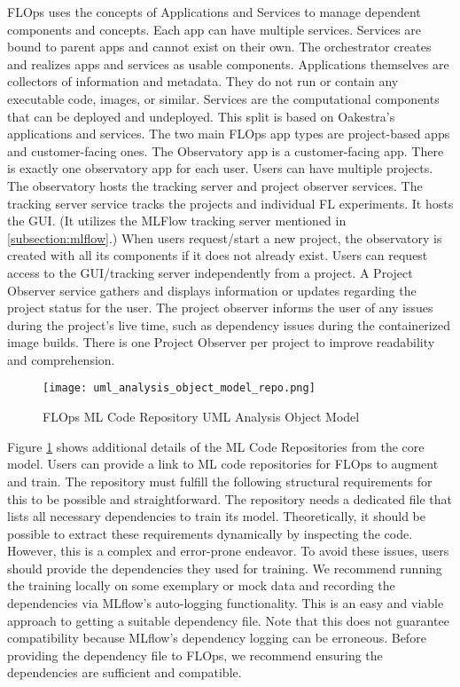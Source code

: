 FLOps uses the concepts of Applications and Services to manage dependent components and concepts.
Each app can have multiple services.
Services are bound to parent apps and cannot exist on their own.
The orchestrator creates and realizes apps and services as usable components.
Applications themselves are collectors of information and metadata.
They do not run or contain any executable code, images, or similar.
Services are the computational components that can be deployed and undeployed.
This split is based on Oakestra's applications and services.
The two main FLOps app types are project-based apps and customer-facing ones.
The Observatory app is a customer-facing app.
There is exactly one observatory app for each user.
Users can have multiple projects.
The observatory hosts the tracking server and project observer services.
The tracking server service tracks the projects and individual FL experiments.
It hosts the GUI. 
(It utilizes the MLFlow tracking server mentioned in \ref{subsection:mlflow}.)
When users request/start a new project, the observatory is created with all its components if it does not already exist.
Users can request access to the GUI/tracking server independently from a project.
A Project Observer service gathers and displays information or updates regarding the project status for the user.
The project observer informs the user of any issues during the project's live time, such as dependency issues during the containerized image builds.
There is one Project Observer per project to improve readability and comprehension.

\begin{figure}[h]
    \centering
    \texttt{[image: uml\_analysis\_object\_model\_repo.png]}
    \caption{FLOps ML Code Repository UML Analysis Object Model}
    \label{fig:uml_repo_analysis_object_model}
\end{figure}

Figure \ref{fig:uml_repo_analysis_object_model} shows additional details of the ML Code Repositories from the core model.
Users can provide a link to ML code repositories for FLOps to augment and train.
The repository must fulfill the following structural requirements for this to be possible and straightforward.
The repository needs a dedicated file that lists all necessary dependencies to train its model.
Theoretically, it should be possible to extract these requirements dynamically by inspecting the code.
However, this is a complex and error-prone endeavor.
To avoid these issues, users should provide the dependencies they used for training.
We recommend running the training locally on some exemplary or mock data and recording the dependencies via MLflow's auto-logging functionality.
This is an easy and viable approach to getting a suitable dependency file.
Note that this does not guarantee compatibility because MLflow's dependency logging can be erroneous.
Before providing the dependency file to FLOps, we recommend ensuring the dependencies are sufficient and compatible.

